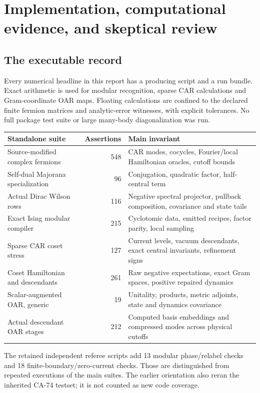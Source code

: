 \section{Implementation, computational evidence, and skeptical review}

\subsection{The executable record}

Every numerical headline in this report has a producing script and a run
bundle. Exact arithmetic is used for modular recognition, sparse CAR
calculations and Gram-coordinate OAR maps. Floating calculations are confined
to the declared finite fermion matrices and analytic-error witnesses, with
explicit tolerances. No full package test suite or large many-body
diagonalization was run.

\begin{longtable}{@{}p{}rp{}@{}}
\toprule
Standalone suite & Assertions & Main invariant\\\midrule
Source-modified complex fermions & 548 & CAR modes, cocycles, Fourier/local
Hamiltonian oracles, cutoff bounds\\
Self-dual Majorana specialization & 96 & Conjugation, quadratic factor,
half-central term\\
Actual Dirac Wilson rows & 116 & Negative spectral projector, pullback
composition, covariance and state tails\\
Exact Ising modular compiler & 215 & Cyclotomic data, emitted recipes,
factor parity, local sampling\\
Sparse CAR coset stress & 127 & Current levels, vacuum descendants,
exact central invariants, refinement signs\\
Coset Hamiltonian and descendants & 261 & Raw negative expectations,
exact Gram spaces, positive repaired dynamics\\
Scalar-augmented OAR, generic & 19 & Unitality, products, metric adjoints,
state and dynamics covariance\\
Actual descendant OAR stages & 212 & Computed basis embeddings and
compressed modes across physical cutoffs\\
\bottomrule
\end{longtable}

The retained independent referee scripts add 13 modular phase/relabel
checks and 18 finite-boundary/zero-current checks. Those are distinguished
from repeated executions of the main suites. The earlier orientation also
reran the inherited CA-74 testset; it is not counted as new code coverage.

